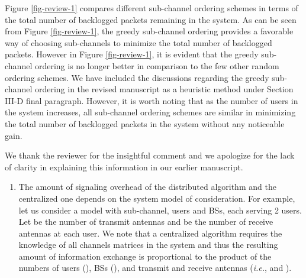 \begin{enumerate}
	Figure \ref{fig-review-1} compares different sub-channel ordering schemes in terms of the total number of backlogged packets remaining in the system. As can be seen from Figure \ref{fig-review-1}, the greedy sub-channel ordering provides a favorable way of choosing sub-channels to minimize the total number of backlogged packets. However in Figure \ref{fig-review-1}, it is evident that the greedy sub-channel ordering is no longer better in comparison to the few other random ordering schemes. We have included the discussions regarding the greedy sub-channel ordering in the revised manuscript as a heuristic method under Section III-D final paragraph. However, it is worth noting that as the number of users in the system increases, all sub-channel ordering schemes are similar in minimizing the total number of backlogged packets in the system without any noticeable gain.
	
	 
	
	\resp
	We thank the reviewer for the insightful comment and we apologize for the lack of clarity in explaining this information in our earlier manuscript.
	\begin{enumerate}
		\item The amount of signaling overhead of the distributed algorithm and the centralized one depends on the system model of consideration. For example, let us consider a model with  sub-channel,  users and  \acp{BS}, each serving 2 users. Let  be the number of transmit antennas and  be the number of receive antennas at each user. We note that a centralized algorithm requires the knowledge of all channels matrices in the system and thus the resulting amount of information exchange is proportional to the product of the numbers of users (), \acp{BS} (), and transmit and receive antennas (\textit{i.e.},  and ).
		

\end{enumerate}
\end{enumerate}
